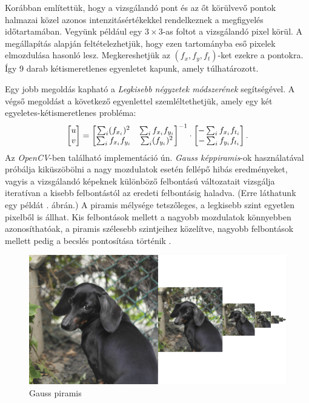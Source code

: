 Korábban említettük, hogy a vizsgálandó pont és az őt körülvevő pontok halmazai közel azonos intenzitásértékekkel rendelkeznek a megfigyelés időtartamában. Vegyünk például egy $3 \times 3$-as foltot a vizsgálandó pixel körül. A megállapítás alapján feltételezhetjük, hogy ezen tartományba eső pixelek elmozdulása hasonló lesz. Megkereshetjük az $(f_x,f_y,f_t)$-ket ezekre a pontokra. Így 9 darab kétismeretlenes egyenletet kapunk, amely túlhatározott.

Egy jobb megoldás kapható a \textit{Legkisebb négyzetek módszerének} segítségével. A végső megoldást a következő egyenlettel szemléltethetjük, amely egy két egyeletes-kétismeretlenes probléma:
\begin{align*}
\bmatrix u \\ v \endbmatrix = {\bmatrix \sum_{i}(f_{x_i})^2 & \sum_{i}f_{x_i}f_{y_i}\\ \sum_{i}f_{x_i}f_{y_i} & \sum_{i}(f_{y_i})^2 \endbmatrix}^{-1} \cdot \bmatrix -\sum_{i}f_{x_i}f_{t_i} \\ -\sum_{i}f_{y_i}f_{t_i} \endbmatrix.
\end{align*}
Az \textit{OpenCV}-ben található implementáció ún. \textit{Gauss képpiramis}-ok használatával próbálja kiküszöbölni a nagy mozdulatok esetén fellépő hibás eredményeket, vagyis a vizsgálandó képeknek különböző felbontású változatait vizsgálja iteratívan a kisebb felbontástól az eredeti felbontásig haladva. (Erre láthatunk egy példát . ábrán.) A piramis mélysége tetszőleges, a legkisebb szint egyetlen pixelből is állhat. Kis felbontások mellett a nagyobb mozdulatok könnyebben azonosíthatóak, a piramis szélesebb szintjeihez közelítve, nagyobb felbontások mellett pedig a becslés pontosítása történik \cite{lucas1981iterative,bradski2008learning}.

\begin{figure}[h]
\centering
\includegraphics[width=\textwidth]{images/gauss_pyramid.png}
\caption{Gauss piramis}
\label{fig:gausspyramid}
\end{figure}

